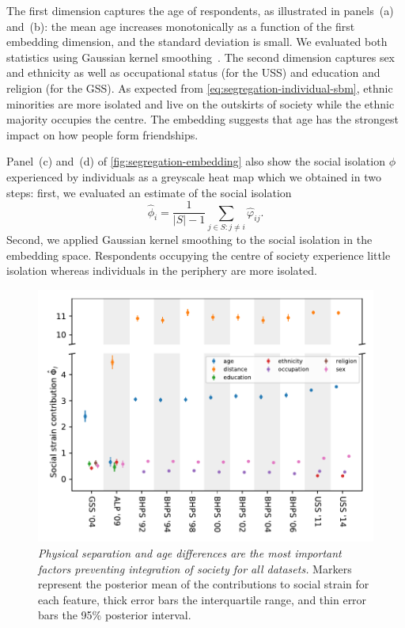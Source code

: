 \documentclass{scrartcl}
\newcommand{\card}[1]{\left|#1\right|}
\newcommand{\titlecaption}[2]{\caption[#1]{\emph{#1} #2}}
\begin{document}
The first dimension captures the age of respondents, as illustrated in panels~(a) and~(b): the mean age increases monotonically as a function of the first embedding dimension, and the standard deviation is small. We evaluated both statistics using Gaussian kernel smoothing~\cite[chapter~6]{Hastie2009}. The second dimension captures sex and ethnicity as well as occupational status (for the USS) and education and religion (for the GSS). As expected from \cref{eq:segregation-individual-sbm}, ethnic minorities are more isolated and live on the outskirts of society while the ethnic majority occupies the centre. The embedding suggests that age has the strongest impact on how people form friendships.

Panel~(c) and~(d) of \cref{fig:segregation-embedding} also show the social isolation $\phi$ experienced by individuals as a greyscale heat map which we obtained in two steps: first, we evaluated an estimate of the social isolation
\[
    \hat\phi_i = \frac{1}{\card{S}-1}\sum_{j\in S:j\neq i} \hat\varphi_{ij}.
\]
Second, we applied Gaussian kernel smoothing to the social isolation in the embedding space. Respondents occupying the centre of society experience little isolation whereas individuals in the periphery are more isolated.

\begin{figure}
    \includegraphics{segregation}
    \titlecaption{Physical separation and age differences are the most important factors preventing integration of society for all datasets.}{Markers represent the posterior mean of the contributions to social strain for each feature, thick error bars the interquartile range, and thin error bars the 95\% posterior interval.\label{fig:segregation-survey}}
\end{figure}
\end{document}
